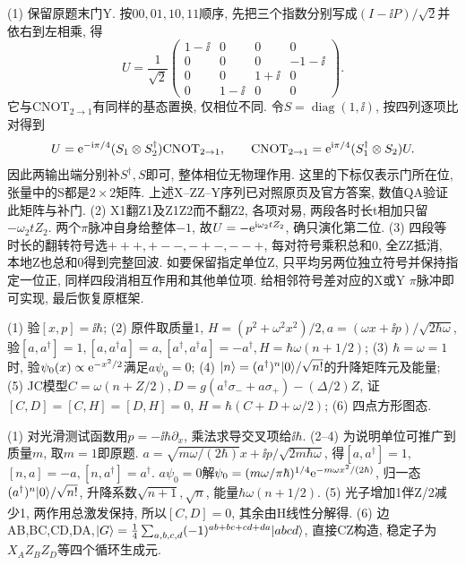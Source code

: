 \begin{solution}(1) 保留原题末门Y. 按$00,01,10,11$顺序, 先把三个指数分别写成$(I-\ii P)/\sqrt2$并依右到左相乘, 得
\[U=\frac1{\sqrt2}\begin{pmatrix}
1-\ii&0&0&0\\0&0&0&-1-\ii\\0&0&1+\ii&0\\0&1-\ii&0&0
\end{pmatrix}.\]
它与$\mathrm{CNOT}_{2\to1}$有同样的基态置换, 仅相位不同. 令$S=\operatorname{diag}(1,\ii)$, 按四列逐项比对得到
\[U=\mathrm e^{-\mathrm i\pi/4}(S_1\otimes S_2^\dagger)\mathrm{CNOT}_{2\to1},\qquad
\mathrm{CNOT}_{2\to1}=\mathrm e^{\mathrm i\pi/4}(S_1^\dagger\otimes S_2)U.\]
因此两输出端分别补$S^\dagger,S$即可, 整体相位无物理作用. 这里的下标仅表示门所在位, 张量中的S都是$2\times2$矩阵. 上述X--ZZ--Y序列已对照原页及官方答案, 数值QA验证此矩阵与补门.
(2) X1翻Z1及Z1Z2而不翻Z2, 各项对易, 两段各时长t相加只留$-\omega_2tZ_2$. 两个$\pi$脉冲自身给整体$-1$, 故$U=-\mathrm e^{\mathrm i\omega_2tZ_2}$, 确只演化第二位. (3) 四段等时长的翻转符号选$+++,+--,-+-,--+$, 每对符号乘积总和0, 全ZZ抵消, 本地Z也总和0得到完整回波. 如要保留指定单位Z, 只平均另两位独立符号并保持指定一位正, 同样四段消相互作用和其他单位项. 给相邻符号差对应的X或Y $\pi$脉冲即可实现, 最后恢复原框架.
\end{solution}
\begin{exercise}(1) 验$[x,p]=\ii\hbar$; (2) 原件取质量1, $H=(p^2+\omega^2x^2)/2,a=(\omega x+\ii p)/\sqrt{2\hbar\omega}$, 验$[a,a^\dagger]=1,[a,a^\dagger a]=a,[a^\dagger,a^\dagger a]=-a^\dagger,H=\hbar\omega(n+1/2)$; (3) $\hbar=\omega=1$时, 验$\psi_0(x)\propto\mathrm e^{-x^2/2}$满足$a\psi_0=0$; (4) $\lvert n\rangle=(a^\dagger)^n\lvert 0\rangle/\sqrt{n!}$的升降矩阵元及能量; (5) JC模型$C=\omega(n+Z/2),D=g(a^\dagger\sigma_-+a\sigma_+)-(\Delta/2)Z$, 证$[C,D]=[C,H]=[D,H]=0$, $H=\hbar(C+D+\omega/2)$; (6) 四点方形图态.\end{exercise}
\begin{solution}(1) 对光滑测试函数用$p=-\ii\hbar\partial_x$, 乘法求导交叉项给$\ii\hbar$. (2--4) 为说明单位可推广到质量$m$, 取$m=1$即原题. $a=\sqrt{m\omega/(2\hbar)}x+\ii p/\sqrt{2m\hbar\omega}$, 得$[a,a^\dagger]=1$, $[n,a]=-a,[n,a^\dagger]=a^\dagger$. $a\psi_0=0$解$\psi_0=(m\omega/\pi\hbar)^{1/4}\mathrm e^{-m\omega x^2/(2\hbar)}$, 归一态$(a^\dagger)^n\lvert 0\rangle/\sqrt{n!}$, 升降系数$\sqrt{n+1},\sqrt n$, 能量$\hbar\omega(n+1/2)$. (5) 光子增加1伴Z/2减少1, 两作用总激发保持, 所以$[C,D]=0$, 其余由H线性分解得. (6) 边AB,BC,CD,DA,$\lvert G\rangle=\frac14\sum_{a,b,c,d}(-1)^{ab+bc+cd+da}\lvert abcd\rangle$, 直接CZ构造, 稳定子为$X_AZ_BZ_D$等四个循环生成元.
\end{solution}
